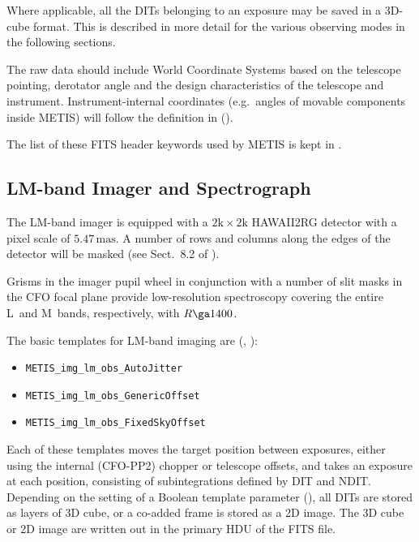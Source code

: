 Where applicable, all the DITs belonging to an exposure may be saved
in a 3D-cube format. This is described in more detail for the various
observing modes in the following sections.

The raw data should include World Coordinate Systems based on the
telescope pointing, derotator angle and the design characteristics of
the telescope and instrument. Instrument-internal coordinates
(e.g.~angles of movable components inside METIS) will follow the
definition in \cite{METIS-coordinates} ().

The list of these FITS header keywords used by METIS is kept in
\cite{METIS-DID}.




\subsection{LM-band Imager and Spectrograph}
\label{ssec:instrument_data_LM-IMG}

The LM-band imager is equipped with a $2\mathrm{k}\times2\mathrm{k}$
HAWAII2RG detector with a pixel scale of $5.47\,\mathrm{mas}$. A
number of rows and columns along the edges of the detector will be
masked (see Sect.~8.2 of \cite{DRLS}).

Grisms in the imager pupil wheel in conjunction with a number of slit
masks in the CFO focal plane provide low-resolution spectroscopy
covering the entire L~and M~bands, respectively, with $R\ga 1400$.

The basic templates for LM-band imaging are
(\cite{METIS-operational_concept}, \cite{METIS-template_manual}):
\begin{itemize}
\item \lstinline{METIS_img_lm_obs_AutoJitter}
\item \lstinline{METIS_img_lm_obs_GenericOffset}
\item \lstinline{METIS_img_lm_obs_FixedSkyOffset}
\end{itemize}

Each of these templates moves the target position between exposures,
either using the internal (CFO-PP2) chopper or telescope offsets, and
takes an exposure at each position, consisting of subintegrations
defined by DIT and NDIT. Depending on the setting of a Boolean
template parameter (), all DITs are stored as
layers of 3D cube, or a co-added frame is stored as a 2D image. The 3D
cube or 2D image are written out in the primary HDU of the FITS file.

